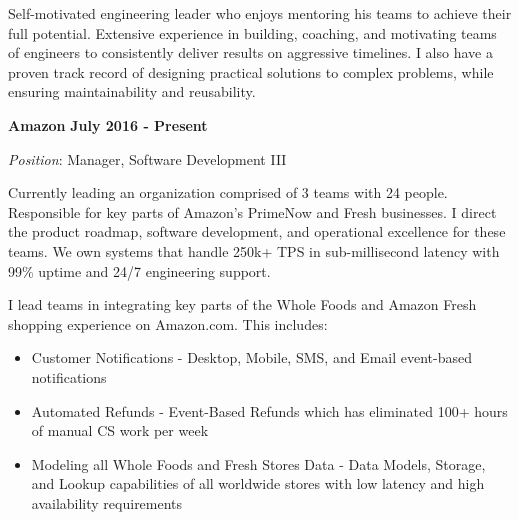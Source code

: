 \documentclass{article}
\begin{document}
\par
\vspace{2\baselineskip}
\par
Self-motivated engineering leader who enjoys mentoring his teams to achieve their full potential. Extensive experience in building, coaching, and motivating teams of engineers to consistently deliver results on aggressive timelines. I also have a proven track record of designing practical solutions to complex problems, while ensuring maintainability and reusability.
\par
\vspace{\baselineskip}
\vspace{\baselineskip}
{\bf Amazon}
\hfill {\bf July 2016 - Present}
\vspace{.03in}
\par
{\it Position}: Manager, Software Development III
\vspace{\baselineskip}
\par
Currently leading an organization comprised of 3 teams with 24 people. Responsible for key parts of Amazon’s PrimeNow and Fresh businesses. I direct the product roadmap, software development, and operational excellence for these teams. We own systems that handle 250k+ TPS in sub-millisecond latency with 99\% uptime and 24/7 engineering support.
\par
\vspace{\baselineskip}
I lead teams in integrating key parts of the Whole Foods and Amazon Fresh shopping experience on Amazon.com. This includes:
\begin{small}
\begin{itemize}
  \item Customer Notifications - Desktop, Mobile, SMS, and Email event-based notifications
  \item Automated Refunds - Event-Based Refunds which has eliminated 100+ hours of manual CS work per week
  \item Modeling all Whole Foods and Fresh Stores Data - Data Models, Storage, and Lookup capabilities of all worldwide stores with low latency and high availability requirements
\end{itemize}
\end{small}
\end{document}
